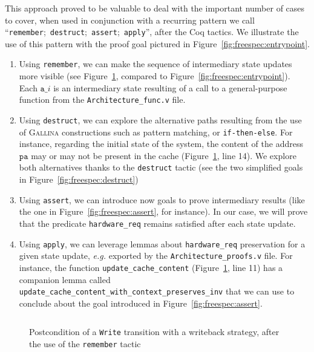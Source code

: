 This approach proved to be valuable to deal with the important number of cases
to cover, when used in conjunction with a recurring pattern we call
``\texttt{remember};~\texttt{destruct};~\texttt{assert};~\texttt{apply}'', after
the Coq tactics.
%
We illustrate the use of this pattern with the proof goal pictured in
Figure~\ref{fig:freespec:entrypoint}.
%
\begin{enumerate}
\item Using \texttt{remember}, we can make the sequence of intermediary state
  updates more visible (see Figure~\ref{fig:freespec:remember}, compared to
  Figure~\ref{fig:freespec:entrypoint}).
  Each \( \mathtt{a\_}i \) is an intermediary state resulting of a call to a
  general-purpose function from the \texttt{Architecture\_func.v} file.
\item Using \texttt{destruct}, we can explore the alternative paths resulting
  from the use of {\scshape Gallina} constructions such as pattern matching, or
  \texttt{if-then-else}.
  For instance, regarding the initial state of the system, the content of the
  address \( \mathtt{pa} \) may or may not be present in the cache
  (Figure~\ref{fig:freespec:remember}, line 14).
  We explore both alternatives thanks to the \texttt{destruct} tactic (see the
  two simplified goals in Figure~\ref{fig:freespec:destruct})
\item Using \texttt{assert}, we can introduce now goals to prove intermediary
  results (like the one in Figure~\ref{fig:freespec:assert}, for instance).
  In our case, we will prove that the predicate \texttt{hardware\_req} remains
  satisfied after each state update.
\item Using \texttt{apply}, we can leverage lemmas about \texttt{hardware\_req}
  preservation for a given state update, \emph{e.g.} exported by the
  \texttt{Architecture\_proofs.v} file.
  For instance, the function \texttt{update\_cache\_content}
  (Figure~\ref{fig:freespec:remember}, line 11) has a companion lemma called
  \texttt{update\_cache\_content\_with\_context\_preserves\_inv} that we can use
  to conclude about the goal introduced in Figure~\ref{fig:freespec:assert}.
\end{enumerate}

\begin{figure}
  \inputminted{coq}{Listings/RememberPattern.v}

  \caption{Postcondition of a \texttt{Write} transition with a writeback
    strategy, after the use of the \texttt{remember} tactic}
  \label{fig:freespec:remember}
\end{figure}

